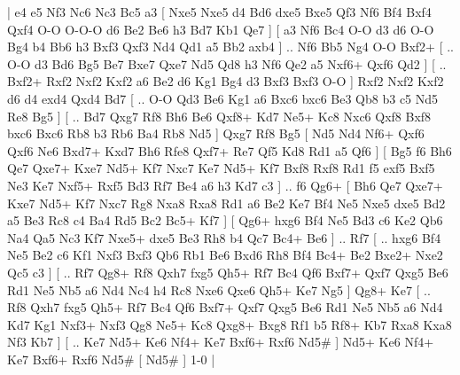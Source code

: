 \makegametitle 
|   e4   e5    Nf3   Nc6    Nc3   Bc5    a3 [  Nxe5 Nxe5  d4 Bd6  dxe5 Bxe5  Qf3 Nf6  Bf4 Bxf4  Qxf4 O-O  O-O-O d6  Be2 Be6  h3 Bd7  Kb1 Qe7   ]  [  a3 Nf6  Bc4 O-O  d3 d6  O-O Bg4  b4 Bb6  h3 Bxf3  Qxf3 Nd4  Qd1 a5  Bb2 axb4   ] .. Nf6    Bb5  Ng4    O-O   Bxf2+ [ .. O-O  d3 Bd6  Bg5 Be7  Bxe7 Qxe7  Nd5 Qd8  h3 Nf6  Qe2 a5  Nxf6+ Qxf6  Qd2   ]  [ .. Bxf2+  Rxf2 Nxf2  Kxf2 a6  Be2 d6  Kg1 Bg4  d3 Bxf3  Bxf3 O-O   ]  Rxf2   Nxf2    Kxf2   d6    d4   exd4    Qxd4   Bd7 [ .. O-O  Qd3 Be6  Kg1 a6  Bxc6 bxc6  Be3 Qb8  b3 c5  Nd5 Re8  Bg5   ]  [ .. Bd7  Qxg7 Rf8  Bh6 Be6  Qxf8+ Kd7  Ne5+ Kc8  Nxc6 Qxf8  Bxf8 bxc6  Bxc6 Rb8  b3 Rb6  Ba4 Rb8  Nd5   ]  Qxg7   Rf8    Bg5 [  Nd5 Nd4  Nf6+ Qxf6  Qxf6 Ne6  Bxd7+ Kxd7  Bh6 Rfe8  Qxf7+ Re7  Qf5 Kd8  Rd1 a5  Qf6   ]  [  Bg5 f6  Bh6 Qe7  Qxe7+ Kxe7  Nd5+ Kf7  Nxc7 Ke7  Nd5+ Kf7  Bxf8 Rxf8  Rd1 f5  exf5 Bxf5  Ne3 Ke7  Nxf5+ Rxf5  Bd3 Rf7  Be4 a6  h3 Kd7  c3   ] .. f6    Qg6+ [  Bh6 Qe7  Qxe7+ Kxe7  Nd5+ Kf7  Nxc7 Rg8  Nxa8 Rxa8  Rd1 a6  Be2 Ke7  Bf4 Ne5  Nxe5 dxe5  Bd2 a5  Be3 Rc8  c4 Ba4  Rd5 Bc2  Bc5+ Kf7   ]  [  Qg6+ hxg6  Bf4 Ne5  Bd3 c6  Ke2 Qb6  Na4 Qa5  Nc3 Kf7  Nxe5+ dxe5  Be3 Rh8  b4 Qc7  Bc4+ Be6   ] .. Rf7 [ .. hxg6  Bf4 Ne5  Be2 c6  Kf1 Nxf3  Bxf3 Qb6  Rb1 Be6  Bxd6 Rh8  Bf4 Bc4+  Be2 Bxe2+  Nxe2 Qc5  c3   ]  [ .. Rf7  Qg8+ Rf8  Qxh7 fxg5  Qh5+ Rf7  Bc4 Qf6  Bxf7+ Qxf7  Qxg5 Be6  Rd1 Ne5  Nb5 a6  Nd4 Nc4  h4 Rc8  Nxe6 Qxe6  Qh5+ Ke7  Ng5   ]  Qg8+   Ke7 [ .. Rf8  Qxh7 fxg5  Qh5+ Rf7  Bc4 Qf6  Bxf7+ Qxf7  Qxg5 Be6  Rd1 Ne5  Nb5 a6  Nd4 Kd7  Kg1 Nxf3+  Nxf3 Qg8  Ne5+ Kc8  Qxg8+ Bxg8  Rf1 b5  Rf8+ Kb7  Rxa8 Kxa8  Nf3 Kb7   ]  [ .. Ke7  Nd5+ Ke6  Nf4+ Ke7  Bxf6+ Rxf6  Nd5#   ]  Nd5+   Ke6   Nf4+   Ke7   Bxf6+   Rxf6    Nd5#    [  Nd5#   ] 1-0  |
